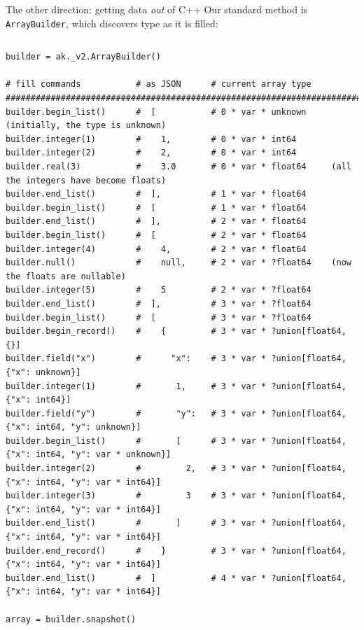 \documentclass[aspectratio=169]{beamer}
\begin{document}
\begin{frame}[fragile]{The other direction: getting data {\it out} of C++}
\vspace{0.2 cm}
Our standard method is \texttt{ArrayBuilder}, which discovers type as it is filled:

\tiny
\vspace{-0.05 cm}
\begin{columns}
\begin{verbatim}
builder = ak._v2.ArrayBuilder()

# fill commands           # as JSON      # current array type
#######################################################################################################
builder.begin_list()      #  [           # 0 * var * unknown     (initially, the type is unknown)
builder.integer(1)        #    1,        # 0 * var * int64
builder.integer(2)        #    2,        # 0 * var * int64
builder.real(3)           #    3.0       # 0 * var * float64     (all the integers have become floats)
builder.end_list()        #  ],          # 1 * var * float64
builder.begin_list()      #  [           # 1 * var * float64
builder.end_list()        #  ],          # 2 * var * float64
builder.begin_list()      #  [           # 2 * var * float64
builder.integer(4)        #    4,        # 2 * var * float64
builder.null()            #    null,     # 2 * var * ?float64    (now the floats are nullable)
builder.integer(5)        #    5         # 2 * var * ?float64
builder.end_list()        #  ],          # 3 * var * ?float64
builder.begin_list()      #  [           # 3 * var * ?float64
builder.begin_record()    #    {         # 3 * var * ?union[float64, {}]
builder.field("x")        #      "x":    # 3 * var * ?union[float64, {"x": unknown}]
builder.integer(1)        #       1,     # 3 * var * ?union[float64, {"x": int64}]
builder.field("y")        #       "y":   # 3 * var * ?union[float64, {"x": int64, "y": unknown}]
builder.begin_list()      #       [      # 3 * var * ?union[float64, {"x": int64, "y": var * unknown}]
builder.integer(2)        #         2,   # 3 * var * ?union[float64, {"x": int64, "y": var * int64}]
builder.integer(3)        #         3    # 3 * var * ?union[float64, {"x": int64, "y": var * int64}]
builder.end_list()        #       ]      # 3 * var * ?union[float64, {"x": int64, "y": var * int64}]
builder.end_record()      #    }         # 3 * var * ?union[float64, {"x": int64, "y": var * int64}]
builder.end_list()        #  ]           # 4 * var * ?union[float64, {"x": int64, "y": var * int64}]

array = builder.snapshot()
\end{verbatim}
\end{columns}
\end{frame}
\end{document}
